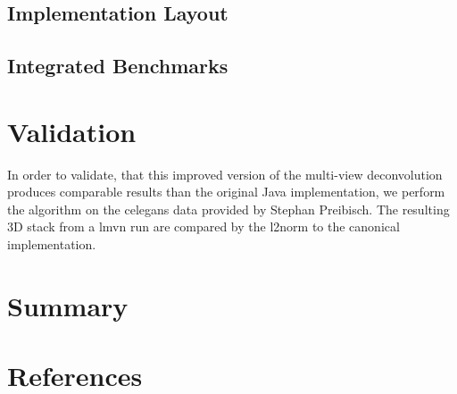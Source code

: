 \documentclass [12pt]{article}
\begin{document}
\subsection{Implementation Layout}

\subsection{Integrated Benchmarks}

\section{Validation}

In order to validate, that this improved version of the multi-view deconvolution produces comparable results than the original Java implementation, we perform the algorithm on the celegans data provided by Stephan Preibisch. The resulting 3D stack from a lmvn run are compared by the l2norm to the canonical implementation.

\section{Summary}


\section{References}


\end{document}
